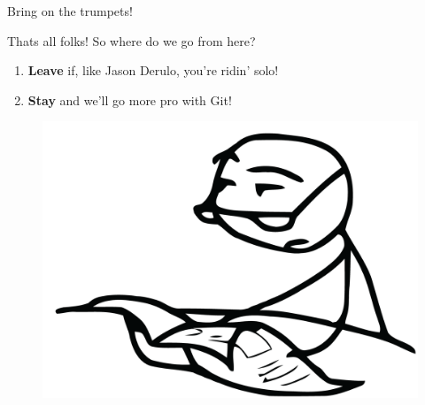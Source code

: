 \begin{frame}{Bring on the trumpets!}
    \begin{block}{Thats all folks!}
        So where do we go from here?
        \begin{enumerate}
            \item \textbf{Leave} if, like Jason Derulo, you're ridin' solo!
            \item \textbf{Stay} and we'll go more pro with Git!
        \end{enumerate}
    \end{block}
    \begin{figure}[ht]
        \centering
        \includegraphics[width=0.8\linewidth]{img/pleasestay.png}
    \end{figure}
\end{frame}
